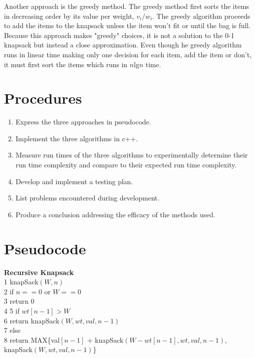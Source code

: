 \documentclass[a4paper]{article}
\begin{document}
    Another approach is the greedy method. The greedy method first sorts the 
    items in decreasing order by its value per weight, $v_{i}/w_{i}$. The greedy 
    algorithm proceeds to add the items to the knapsack unless the item won't fit or
    until the bag is full. Because this approach makes "greedy" choices, it is not a 
    solution to the 0-1 knapsack but instead a close approximation. Even though he 
    greedy algorithm runs in linear time making only one decision for each item, add 
    the item or don't, it must first sort the items which runs in $n$lg$n$ time. \\



    \section{Procedures}
    \begin{enumerate}

        \item Express the three approaches in pseudocode.

        \item Implement the three algorithms in c++.
        
        \item Measure run times of the three algorithms to experimentally determine 
              their run time complexity and compare to their expected run time 
              complexity.

        \item Develop and implement a testing plan.
        
        \item List problems encountered during development.
        
        \item Produce a conclusion addressing the efficacy of the methods used.
    \end{enumerate}

    
    \section{Pseudocode}
    \textbf{Recursive Knapsack} \\
    1 knapSack$(W, n)$ \\
    2 if $n == 0$ or $W == 0$ \\
    3   \phantom{hell}return 0 \\
    4 
    5 if $wt[n-1] > W$ \\
    6 \phantom{hell}return knapSack$(W, wt, val, n-1)$ \\
    7 else \\
    8 \phantom{hell}return MAX\{val$[n-1]$ + knapSack$(W-wt[n-1], wt, val, n-1)$, \\
                              \phantom{hellhellhellhellhell}knapSack$(W, wt, val, n-1)$\} \\
\end{document}
